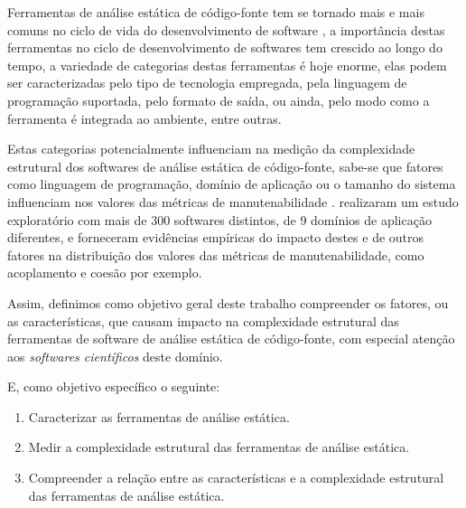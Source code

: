 
Ferramentas de análise estática de código-fonte tem se tornado mais e mais
comuns no ciclo de vida do desenvolvimento de software \cite{Novak2010}, a
importância destas ferramentas no ciclo de desenvolvimento de softwares tem
crescido ao longo do tempo, a variedade de categorias destas ferramentas é hoje
enorme, elas podem ser caracterizadas pelo tipo de tecnologia empregada, pela
linguagem de programação suportada, pelo formato de saída, ou ainda, pelo modo
como a ferramenta é integrada ao ambiente, entre outras.

Estas categorias potencialmente influenciam na medição da complexidade
estrutural dos softwares de análise estática de código-fonte, sabe-se que
fatores como linguagem de programação, domínio de aplicação ou o tamanho do
sistema influenciam nos valores das métricas de manutenabilidade
\cite{Zhang2013}.  realizaram um estudo exploratório com
mais de 300 softwares distintos, de 9 domínios de aplicação diferentes, e
forneceram evidências empíricas do impacto destes e de outros fatores na
distribuição dos valores das métricas de manutenabilidade, como acoplamento e
coesão por exemplo. 

Assim, definimos como objetivo geral deste trabalho compreender os
fatores, ou as características, que causam impacto na complexidade estrutural
das ferramentas de software de análise estática de código-fonte, com especial
atenção aos {\it softwares científicos} deste domínio.

E, como objetivo específico o seguinte:

\begin{enumerate}
  \item Caracterizar as ferramentas de análise estática.
  \item Medir a complexidade estrutural das ferramentas de análise estática.
  \item Compreender a relação entre as características e a complexidade estrutural
        das ferramentas de análise estática.
\end{enumerate}


